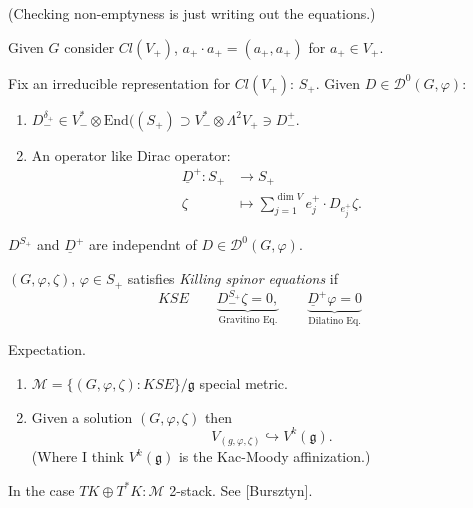 (Checking non-emptyness is just writing out the equations.)

\medskip\noindent
Given $G$ consider $Cl (V_+)$,
 $a_+\cdot a_+=(a_+,a_+)$ for $a_+ \in V_+$.

Fix an irreducible representation for $Cl(V_+)$: $S_+$.
Given  $D \in \mathcal{D}^0(G,\varphi)$:
\begin{enumerate}
\item $D_-^{\delta_+} \in V_-^* \otimes \text{End}((S_+)\supset
V_-^*\otimes \Lambda^{2}V_+ \ni D_-^+$.
\item An operator like Dirac operator:
\begin{align*}
\underline{D}^+: S_+ &\longrightarrow S_+ \\
\zeta &\longmapsto \sum_{j=1}^{\dim V}e_j^+\cdot D_{e_j^+}\zeta.
\end{align*}
\end{enumerate}

\begin{lemma}
\label{lemma-independendant}
$D^{S_+}$ and $\underline{D}^+$ are independnt of
$D \in \mathcal{D}^0(G,\varphi)$.
\end{lemma}

\begin{definition}
\label{definition-Killing-spinor-equations}
$(G,\varphi,\zeta)$, $\varphi \in S_+$ satisfies
{\it Killing spinor equations} if
$$
KSE\qquad \underbrace{D_-^{S_+}\zeta=0,}_{\text{Gravitino Eq.}}\qquad 
\underbrace{\underline{D}^+\varphi=0
}_{\text{Dilatino Eq.}}$$
\end{definition}

Expectation.
\begin{enumerate}
\item $\mathcal{M}=\{(G,\varphi,\zeta):KSE\}/\mathfrak{g}$ special metric.
\item Given a solution $(G,\varphi,\zeta)$
then 
$$
V_{(g,\varphi,\zeta)}\hookrightarrow V^k(\mathfrak{g}).
$$
(Where I think $V^k(\mathfrak{g})$ is the Kac-Moody affinization.)
\end{enumerate}

\begin{remark}
\label{remark-Lie-algebra}
In the case $T K \oplus T^*K: \mathcal{M}$ 2-stack. See [Bursztyn].
\end{remark}

